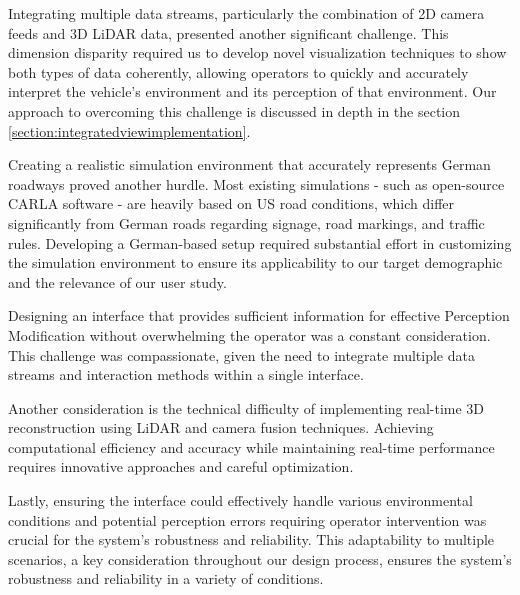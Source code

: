 Integrating multiple data streams, particularly the combination of 2D camera feeds and 3D LiDAR data, presented another significant challenge.
This dimension disparity required us to develop novel visualization techniques to show both types of data coherently, allowing operators
to quickly and accurately interpret the vehicle's environment and its perception of that environment. Our approach to overcoming this challenge is
discussed in depth in the section \ref{section:integratedviewimplementation}.

Creating a realistic simulation environment that accurately represents German roadways proved another hurdle. Most existing simulations - such as open-source CARLA software \cite{Dosovitskiy2017CARLAAO} - are heavily based on US road conditions, which differ significantly from German roads regarding signage, road markings, and traffic rules. Developing a German-based setup required substantial effort in customizing the simulation environment to ensure its applicability to our target demographic and the relevance of our user study.

Designing an interface that provides sufficient information for effective Perception Modification without overwhelming the operator was a constant consideration. This challenge was compassionate, given the need to integrate multiple data streams and interaction methods within a single interface.

Another consideration is the technical difficulty of implementing real-time 3D reconstruction using LiDAR and camera fusion techniques. Achieving computational efficiency and accuracy while maintaining real-time performance requires innovative approaches and careful optimization.

Lastly, ensuring the interface could effectively handle various environmental conditions and potential perception errors requiring operator intervention was crucial for the system's robustness and reliability. This adaptability to multiple scenarios, a key consideration throughout our design process, ensures the system's robustness and reliability in a variety of conditions.

